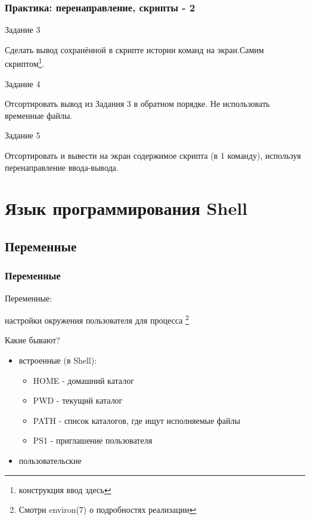 \begin{frame}
  \frametitle{Практика: перенаправление, скрипты - 2}

  \alert{Задание 3}
  
  Сделать вывод сохранённой в скрипте истории команд на экран.\newline Самим скриптом\footnote{конструкция \textquotedbl ввод здесь \textquotedbl}.

  \pause

  \alert{Задание 4}

  Отсортировать вывод из \alert{Задания 3} в обратном порядке. \newline Не использовать временные файлы.
  
  \pause

  \alert{Задание 5} 

  Отсортировать и вывести на экран содержимое скрипта (в 1 команду), используя перенаправление ввода-вывода.


\end{frame}

\section{Язык программирования Shell}

\subsection{Переменные}

\begin{frame}[fragile]
  \frametitle{Переменные}

  \Large{\alert{Переменные:}}
  
  \normalsize{настройки окружения пользователя для процесса}
  \footnote{Смотри environ(7) о подробностях реализации} \newline

  \pause 

  \Large{\alert{Какие бывают?}}
  \normalsize{ }
  \begin{itemize}
    \item встроенные (в Shell): 
      \begin{itemize}
	\item HOME - домашний каталог
	\item PWD - текущий каталог
	\item PATH - список каталогов, где ищут исполняемые файлы
	\item PS1 - приглашение пользователя
      \end{itemize}
    \item пользовательские 
  \end{itemize} 

\end{frame}

